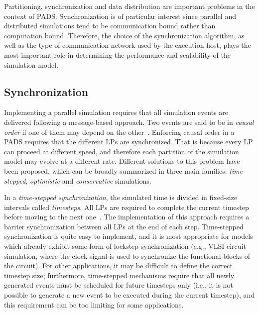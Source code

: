\documentclass[1p]{elsarticle}
\begin{document}
Partitioning, synchronization and data distribution are important
problems in the context of PADS. Synchronization is of particular
interest since parallel and distributed simulations tend to be
communication bound rather than computation bound. Therefore, the
choice of the synchronization algorithm, as well as the type of communication
network used by the execution host, plays the most important role in
determining the performance and scalability of the simulation model.

\subsection{Synchronization}\label{Synchronization}

Implementing a parallel simulation requires that all simulation events are delivered
following a message-based approach. Two events are said to be in
\emph{causal order} if one of them may depend on the
other~\cite{Lamport1978}. Enforcing causal order in a PADS requires
that the different LPs are synchronized. That is because every LP can
proceed at different speed, and therefore each partition of the
simulation model may evolve at a different rate. Different solutions
to this problem have been proposed, which can be broadly summarized in
three main families: \emph{time-stepped}, \emph{optimistic} and
\emph{conservative} simulations.

In a \emph{time-stepped synchronization}, the simulated time is
divided in fixed-size intervals called \emph{timesteps}. All LPs are
required to complete the current timestep before moving to the next
one~\cite{1261535}. The implementation of this approach requires a
barrier synchronization between all LPs at the end of each step. 
Time-stepped synchronization is quite easy to implement, and it is most
appropriate for models which already exhibit some form of lockstep
synchronization (e.g., VLSI circuit simulation, where the clock signal
is used to synchronize the functional blocks of the circuit). For
other applications, it may be difficult to define the correct timestep
size; furthermore, time-stepped mechanisms require that all newly
generated events must be scheduled for future timesteps only (i.e., it
is not possible to generate a new event to be executed during the
current timestep), and this requirement can be too limiting for some
applications.
\end{document}
